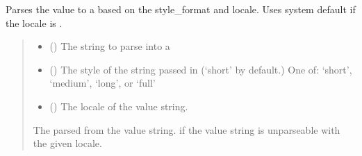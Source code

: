 \documentclass[letterpaper,10pt,english]{sphinxmanual}
\begin{document}

\begin{fulllineitems}
\label{\detokenize{apache_commons_validator_python.util:apache_commons_validator_python.util.datetime_helpers.ldml2strptime}}
\pysigstartsignatures
{}
\pysigstopsignatures
\sphinxAtStartPar
Parses the value to a  based on the style\_format and locale.
Uses system default if the locale is .
\begin{quote}\begin{description}
\begin{itemize}
\item {} 
\sphinxAtStartPar
{} () \textendash{} The string to parse into a 

\item {} 
\sphinxAtStartPar
{} () \textendash{} The style of the  string passed in (‘short’ by default.)
One of: ‘short’, ‘medium’, ‘long’, or ‘full’

\item {} 
\sphinxAtStartPar
{} () \textendash{} The locale of the value string.

\end{itemize}

\sphinxAtStartPar
The parsed  from the value string.
 if the value string is unparseable with the given locale.

\end{description}\end{quote}

\end{fulllineitems}
\end{document}
